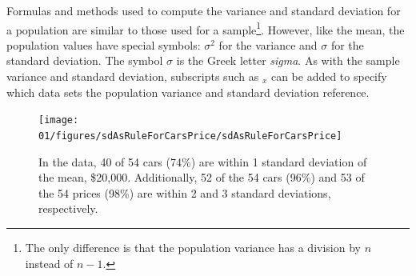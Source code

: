 Formulas and methods used to compute the variance and standard deviation for a population are similar to those used for a sample\footnote{The only difference is that the population variance has a division by $n$ instead of $n-1$.}. However, like the mean, the population values have special symbols: $\sigma_{}^2$ for the variance and $\sigma$ for the standard deviation. The symbol $\sigma$ is the Greek letter \emph{sigma}. As with the sample variance and standard deviation, subscripts such as $_{x}^{}$ can be added to specify which data sets the population variance and standard deviation reference.
\begin{figure}
\centering
\texttt{[image: 01/figures/sdAsRuleForCarsPrice/sdAsRuleForCarsPrice]}
\caption{In the  data, 40 of 54 cars (74\%) are within 1 standard deviation of the mean, \$20,000. Additionally, 52 of the 54 cars (96\%) and 53 of the 54 prices (98\%) are within 2 and 3 standard deviations, respectively.}
\label{sdAsRuleForCarsPrice}
\end{figure}

